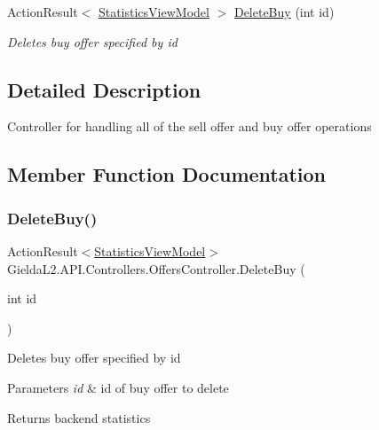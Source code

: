 \begin{DoxyCompactItemize}
Action\+Result$<$ \mbox{\hyperlink{class_gielda_l2_1_1_a_p_i_1_1_view_models_1_1_view_1_1_statistics_view_model}{Statistics\+View\+Model}} $>$ \mbox{\hyperlink{class_gielda_l2_1_1_a_p_i_1_1_controllers_1_1_offers_controller_a078d345982da520c9a7d40de6d7a99e6}{Delete\+Buy}} (int id)
\begin{DoxyCompactList}\small\item\em Deletes buy offer specified by id \end{DoxyCompactList}\end{DoxyCompactItemize}


\subsection{Detailed Description}
Controller for handling all of the sell offer and buy offer operations 



\subsection{Member Function Documentation}
\mbox{\label{class_gielda_l2_1_1_a_p_i_1_1_controllers_1_1_offers_controller_a078d345982da520c9a7d40de6d7a99e6}} 
\subsubsection{\texorpdfstring{DeleteBuy()}{DeleteBuy()}}
{\footnotesize\ttfamily Action\+Result$<$\mbox{\hyperlink{class_gielda_l2_1_1_a_p_i_1_1_view_models_1_1_view_1_1_statistics_view_model}{Statistics\+View\+Model}}$>$ Gielda\+L2.\+A\+P\+I.\+Controllers.\+Offers\+Controller.\+Delete\+Buy (\begin{DoxyParamCaption}\item[{int}]{id }\end{DoxyParamCaption})}



Deletes buy offer specified by id 


\begin{DoxyParams}{Parameters}
{\em id} & id of buy offer to delete\\
\hline
\end{DoxyParams}
\begin{DoxyReturn}{Returns}
backend statistics
\end{DoxyReturn}
\mbox{\label{class_gielda_l2_1_1_a_p_i_1_1_controllers_1_1_offers_controller_a8290b7e739c2756489ff7d00b160fb82}} 
